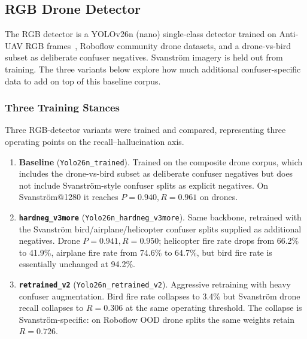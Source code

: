 \subsection{RGB Drone Detector}
\label{sec:rgb_detector}

The RGB detector is a YOLOv26n (nano) single-class detector trained on Anti-UAV RGB frames~\cite{jiang2021antiuav}, Roboflow community drone datasets, and a drone-vs-bird subset as deliberate confuser negatives. Svanstr\"om imagery is held out from training. The three variants below explore how much additional confuser-specific data to add on top of this baseline corpus.

\subsubsection{Three Training Stances}
\label{sec:rgb_three_variants}

Three RGB-detector variants were trained and compared, representing three operating points on the recall--hallucination axis.

\begin{enumerate}
    \item \textbf{Baseline} (\texttt{Yolo26n\_trained}). Trained on the composite drone corpus, which includes the drone-vs-bird subset as deliberate confuser negatives but does not include Svanstr\"om-style confuser splits as explicit negatives. On Svanstr\"om@1280 it reaches $P=0.940, R=0.961$ on drones.
    \item \textbf{\texttt{hardneg\_v3more}} (\texttt{Yolo26n\_hardneg\_v3more}). Same backbone, retrained with the Svanstr\"om bird/airplane/helicopter confuser splits supplied as additional negatives. Drone $P=0.941, R=0.950$; helicopter fire rate drops from 66.2\% to 41.9\%, airplane fire rate from 74.6\% to 64.7\%, but bird fire rate is essentially unchanged at 94.2\%.
    \item \textbf{\texttt{retrained\_v2}} (\texttt{Yolo26n\_retrained\_v2}). Aggressive retraining with heavy confuser augmentation. Bird fire rate collapses to 3.4\% but Svanstr\"om drone recall collapses to $R=0.306$ at the same operating threshold. The collapse is Svanstr\"om-specific: on Roboflow OOD drone splits the same weights retain $R=0.726$.
\end{enumerate}

